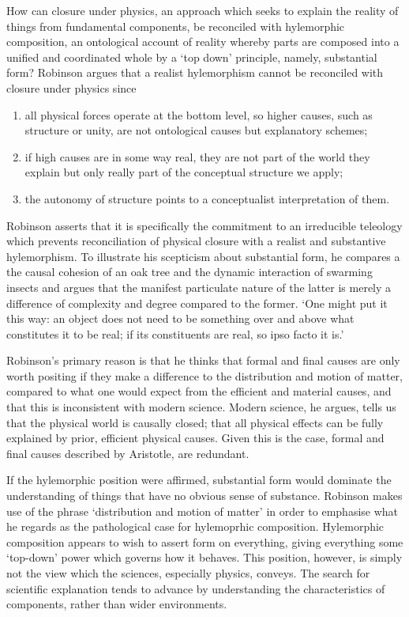How can closure under physics, an approach which seeks to explain the reality of things from fundamental components, be reconciled with hylemorphic composition, an ontological account of reality whereby parts are composed into a unified and coordinated whole by a `top down' principle, namely, substantial form? Robinson argues that a realist hylemorphism cannot be reconciled with closure under physics since
\begin{enumerate}
\item all physical forces operate at the bottom level, so higher causes, such as structure or unity, are not ontological causes but explanatory schemes;
\item if high causes are in some way real, they are not part of the world they explain but only really part of the conceptual structure we apply;
\item the autonomy of structure points to a conceptualist interpretation of them.
\end{enumerate}
Robinson asserts that it is specifically the commitment to an irreducible teleology which prevents reconciliation of physical closure with a realist and substantive hylemorphism. To illustrate his scepticism about substantial form, he compares a the causal cohesion of an oak tree and the dynamic interaction of swarming insects and argues that the manifest particulate nature of the latter is merely a difference of complexity and degree compared to the former. `One might put it this way: an object does not need to be something over and above what constitutes it to be real; if its constituents are real, so ipso facto it is.' \parencite[][208]{Robinson2014-ROBMHA-3}

Robinson's primary reason is that he thinks that formal and final causes are only worth positing if they make a difference to the distribution and motion of matter, compared to what one would expect from the efficient and material causes, and that this is inconsistent with modern science. Modern science, he argues, tells us that the physical world is causally closed; that all physical effects can be fully explained by prior, efficient physical causes. Given this is the case, formal and final causes described by Aristotle, are redundant.

If the hylemorphic position were affirmed, substantial form would dominate the understanding of things that have no obvious sense of substance. Robinson makes use of the phrase `distribution and motion of matter' in order to emphasise what he regards as the pathological case for hylemoprhic composition. Hylemorphic composition appears to wish to assert form on everything, giving everything some `top-down' power which governs how it behaves. This position, however, is simply not the view which the sciences, especially physics, conveys. The search for scientific explanation tends to advance by understanding the characteristics of components, rather than wider environments.

